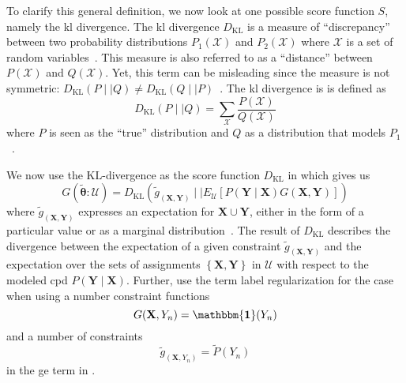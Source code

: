 \bigskip

To clarify this general definition, we now look at one possible score function $S$, namely the \acrfull{kl} divergence.
The \gls{kl} divergence $D_{\text{KL}}$ is a measure of ``discrepancy'' between two probability distributions $P_1(\mathcal{X})$ and $P_2(\mathcal{X})$ where $\mathcal{X}$ is a set of \glspl{random variable}~\citep{burnham2003model}.
This measure is also referred to as a ``distance'' between $P(\mathcal{X})$ and $Q(\mathcal{X})$.
Yet, this term can be misleading since the measure is not symmetric: $D_{\text{KL}}(P\mid\mid Q)\neq D_{\text{KL}}(Q\mid\mid P)$~\citep{burnham2003model}.
The \gls{kl} divergence is is defined as~\citep{mackay2003information}
\begin{equation}
  \label{equ:kl-divergence}
  D_{\text{KL}}(P\mid\mid Q)=\sum_\mathcal{X} \frac{P(\mathcal{X})}{Q(\mathcal{X})}
\end{equation}
where $P$ is seen as the ``true'' distribution and $Q$ as a distribution that models $P_1$~\citep{burnham2003model}.

\bigskip

We now use the $\text{KL}$-divergence as the score function $D_{\text{KL}}$ in  which gives us~\citep{mann2010generalized}
\begin{equation}
  \label{equ:generalized-expectation-kl}
  G(\bm{\tilde{\theta}}:\mathcal{U})=D_{\text{KL}}\left(\tilde{g}_{\left(\mathbf{X},\mathbf{Y}\right)}\mid\mid E_{\mathcal{U}}\left[P(\mathbf{Y}\mid\mathbf{X})G(\mathbf{X},\mathbf{Y})\right]\right)
\end{equation}
where $\tilde{g}_{\left(\mathbf{X},\mathbf{Y}\right)}$ expresses an expectation for $\mathbf{X}\cup\mathbf{Y}$, either in the form of a particular value or as a \gls{marginal distribution}~\citep{mann2010generalized}.
The result of $D_{\text{KL}}$ describes the divergence between the expectation of a given constraint $\tilde{g}_{\left(\mathbf{X},\mathbf{Y}\right)}$ and the expectation over the sets of assignments $\left\{\mathbf{X},\mathbf{Y}\right\}$ in $\mathcal{U}$ with respect to the modeled \gls{cpd} $P(\mathbf{Y}\mid\mathbf{X})$.
Further, \citet{mann2010generalized} use the term \gls{label regularization} for the case when using a number constraint functions
\begin{equation}
  \label{equ:label-regularization-constraint-function}
  G(\mathbf{X},Y_n)=\mathbf{\mathbbm{1}}(Y_n)
\end{equation}
and a number of constraints
\begin{equation}
  \label{equ:label-regularization-constraints}
  \tilde{g}_{\left(\mathbf{X},Y_n\right)}=\tilde{P}(Y_n)
\end{equation}
in the \gls{ge} term in .

